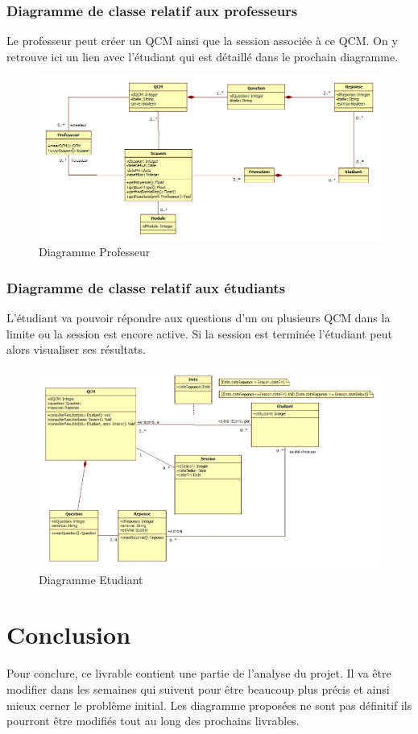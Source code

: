 \documentclass[10pt,a4paper,titlepage]{report}
\begin{document}
\subsection{Diagramme de classe relatif aux professeurs}
Le professeur peut créer un QCM ainsi que la session associée à ce QCM. On y retrouve ici un lien avec l'étudiant qui est détaillé dans le prochain diagramme.
\begin{figure}[h!]
		\caption{Diagramme Professeur}
		\centering
		\includegraphics[scale=0.4]{Include/classe/prof.jpg}
\end{figure}\newpage
\subsection{Diagramme de classe relatif aux étudiants}
L'étudiant va pouvoir répondre aux questions d'un ou plusieurs QCM dans la limite ou la session est encore active. Si la session est terminée l'étudiant peut alors visualiser ses résultats.
\begin{figure}[h!]
		\caption{Diagramme Etudiant}
		\centering
		\includegraphics[scale=0.5]{Include/classe/etudiant.jpg}
\end{figure}

\chapter*{Conclusion}
Pour conclure, ce livrable contient une partie de l'analyse du projet. Il va être modifier dans les semaines qui suivent pour être beaucoup plus précis et ainsi mieux cerner le problème initial.
Les diagramme proposées ne sont pas définitif ils pourront être modifiés tout au long des prochains livrables.
\end{document}
